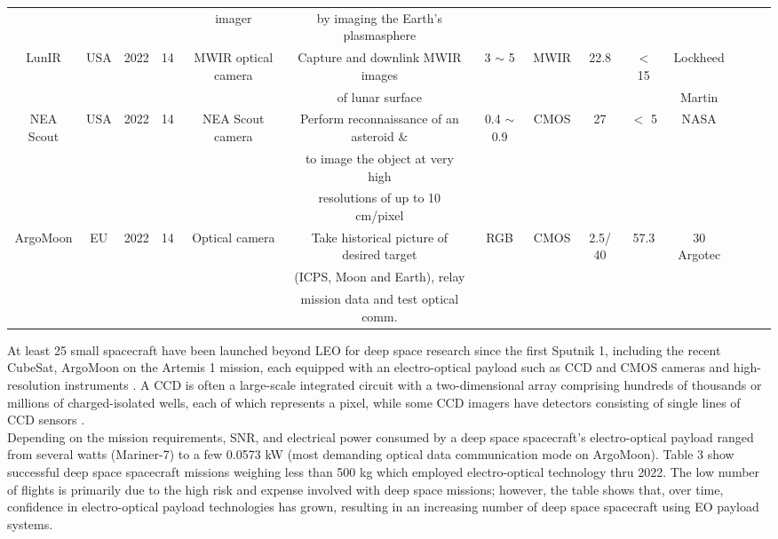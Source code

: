 \documentclass[final,5p,times,twocolumn]{elsarticle}
\begin{document}
\begin{table}
{\begin{tabular}{c c c c c c c c c c c c c c}
			& & & & imager & by imaging the Earth’s plasmasphere & & & & & &  &\\
			LunIR & USA & 2022 & 14 & MWIR optical camera & Capture and downlink MWIR images &  3 $\sim$ 5 & MWIR & 22.8 & $<$ 15 &   Lockheed & \citep{martinez2021advanced, crusan2019nasa}\\
			& & & & & of lunar surface & & & & &   Martin &\\
			NEA Scout & USA & 2022 & 14 & NEA Scout camera & Perform reconnaissance of an asteroid $\&$ & 0.4 $\sim$ 0.9 & CMOS & 27 & $<$ 5   & NASA & \citep{johnson2022near, mcnutt2014near}\\
			& & & & & to image the object at very high & & & & & & & \\
			& & & & & resolutions of up to 10 cm/pixel & & & & & & &&\\
			ArgoMoon & EU & 2022 & 14 & Optical camera & Take historical picture of desired target  & RGB & CMOS & 2.5/ 40 & 57.3 & 30   Argotec & \citep{di2019argomoon, molli2023design}\\
			& & & & & (ICPS, Moon and Earth), relay & & & & & & &\\
			& & & & &   mission data and test optical comm.  & & & & &  & &\\
			\hline
		\end{tabular}
	}
\end{table}
At least 25 small spacecraft have been launched beyond LEO for deep space research since the first Sputnik 1, including the recent CubeSat, ArgoMoon on the Artemis 1 mission, each equipped with an electro-optical payload such as CCD and CMOS cameras and high-resolution instruments \citep{hambleton2016international}. A CCD is often a large-scale integrated circuit with a two-dimensional array comprising hundreds of thousands or millions of charged-isolated wells, each of which represents a pixel, while some CCD imagers have detectors consisting of single lines of CCD sensors \citep{nas2023}. \\
Depending on the mission requirements, SNR, and electrical power consumed by a deep space spacecraft's electro-optical payload ranged from several watts (Mariner-7) to a few 0.0573 kW \citep{di2019argomoon} (most demanding optical data communication mode on ArgoMoon). Table 3 show successful deep space spacecraft missions weighing less than 500 kg which employed electro-optical technology thru 2022. The low number of flights is primarily due to the high risk and expense involved with deep space missions; however, the table shows that, over time, confidence in electro-optical payload technologies has grown, resulting in an increasing number of deep space spacecraft using EO payload systems.\\
\end{document}
